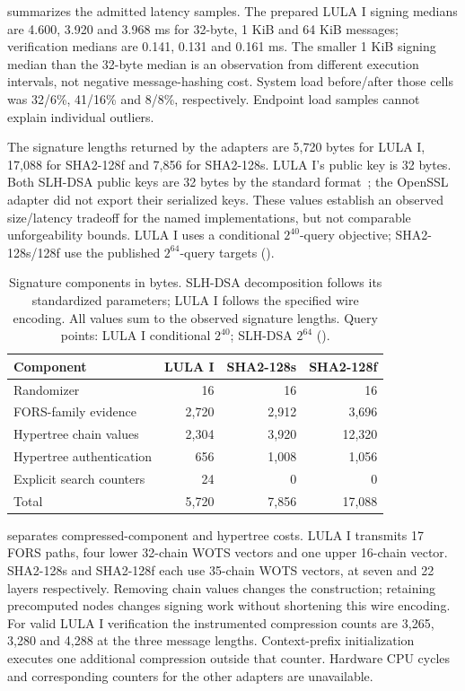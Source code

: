  summarizes the admitted latency samples. The prepared LULA I signing medians are 4.600, 3.920 and 3.968 ms for 32-byte, 1 KiB and 64 KiB messages; verification medians are 0.141, 0.131 and 0.161 ms. The smaller 1 KiB signing median than the 32-byte median is an observation from different execution intervals, not negative message-hashing cost. System load before/after those cells was 32/6\%, 41/16\% and 8/8\%, respectively. Endpoint load samples cannot explain individual outliers.

The signature lengths returned by the adapters are 5,720 bytes for LULA I, 17,088 for SHA2-128f and 7,856 for SHA2-128s. LULA I's public key is 32 bytes. Both SLH-DSA public keys are 32 bytes by the standard format~\cite[Section~9.1 and Table~2]{fips205}; the OpenSSL adapter did not export their serialized keys. These values establish an observed size/latency tradeoff for the named implementations, but not comparable unforgeability bounds. LULA I uses a conditional $2^{40}$-query objective; SHA2-128s/128f use the published $2^{64}$-query targets ().

\begin{table}[t]
\caption{Signature components in bytes. SLH-DSA decomposition follows its standardized parameters; LULA I follows the specified wire encoding. All values sum to the observed signature lengths. Query points: LULA I conditional $2^{40}$; SLH-DSA $2^{64}$ ().}\label{tab:comparison-bytes}
\centering\small
\begin{tabular}{lrrr}\toprule
Component & LULA I & SHA2-128s & SHA2-128f\\\midrule
Randomizer &16&16&16\\
FORS-family evidence &2,720&2,912&3,696\\
Hypertree chain values &2,304&3,920&12,320\\
Hypertree authentication &656&1,008&1,056\\
Explicit search counters &24&0&0\\\midrule
Total &5,720&7,856&17,088\\\bottomrule
\end{tabular}
\end{table}
 separates compressed-component and hypertree costs. LULA I transmits 17 FORS paths, four lower 32-chain WOTS vectors and one upper 16-chain vector. SHA2-128s and SHA2-128f each use 35-chain WOTS vectors, at seven and 22 layers respectively. Removing chain values changes the construction; retaining precomputed nodes changes signing work without shortening this wire encoding. For valid LULA I verification the instrumented compression counts are 3,265, 3,280 and 4,288 at the three message lengths. Context-prefix initialization executes one additional compression outside that counter. Hardware CPU cycles and corresponding counters for the other adapters are unavailable.

